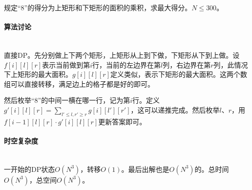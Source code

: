 \documentclass[UTF8]{ctexart}
\newcommand{\myparagraph}[1]{\paragraph{#1}\mbox{}\\}
\theoremstyle{nonumberplain}
\begin{document}
			规定“8”的得分为上矩形和下矩形的面积的乘积，求最大得分。$N \leq 300$。
		
		\myparagraph{算法讨论}
			
			直接DP。先分别做上下两个矩形，上矩形从上到下做，下矩形从下到上做。设$f[i][l][r]$表示当前做到第$i$行，当前的左边界在第$l$列，右边界在第$r$列，此情况下上矩形的最大面积。$g[i][l][r]$定义类似，表示下矩形的最大面积。这两个数组可以直接转移，满足边上的格子都是好的即可。
			
			然后枚举“8”的中间一横在哪一行，记为第$i$行。定义$g'[i][l][r]=\sum_{l' \leq l, r' \geq r}g[i][l'][r']$，这可以递推完成。然后枚举$l$、$r$，用$f[i-1][l][r] \cdot g'[i][l][r]$更新答案即可。
		
		\myparagraph{时空复杂度}
		
			一开始的DP状态$O(N^3)$，转移$O(1)$。最后出解也是$O(N^3)$的。总时间$O(N^3)$，总空间$O(N^3)$。
	
\end{document}
